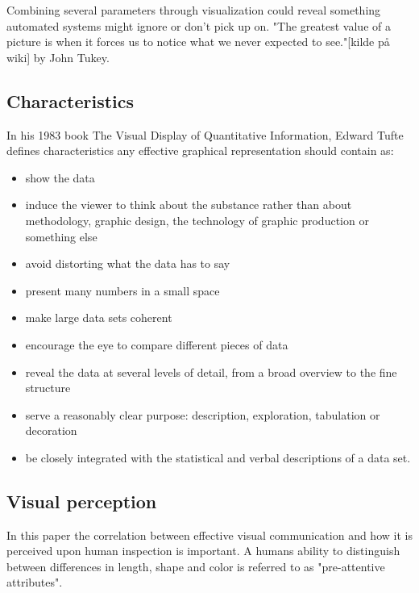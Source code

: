 Combining several parameters through visualization could reveal something automated systems might ignore or don't pick up on. "The greatest value of a picture is when it forces us to notice what we never expected to see."[kilde på wiki] by John Tukey.

\subsection{Characteristics}
In his 1983 book The Visual Display of Quantitative Information, Edward Tufte defines characteristics any effective graphical representation should contain as:

\begin{itemize}
\item show the data
\item induce the viewer to think about the substance rather than about methodology, graphic design, the technology of graphic production or something else
\item avoid distorting what the data has to say
\item present many numbers in a small space
\item make large data sets coherent
\item encourage the eye to compare different pieces of data
\item reveal the data at several levels of detail, from a broad overview to the fine structure
\item serve a reasonably clear purpose: description, exploration, tabulation or decoration
\item be closely integrated with the statistical and verbal descriptions of a data set.
\end{itemize}

\subsection{Visual perception}
In this paper the correlation between effective visual communication and how it is perceived upon human inspection is important. A humans ability to distinguish between differences in length, shape and color is referred to as "pre-attentive attributes".  

